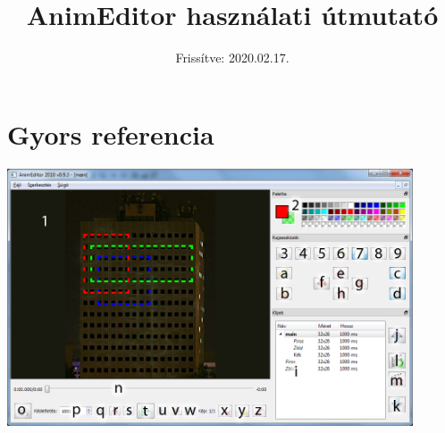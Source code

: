 \documentclass[a4paper,12pt,release]{article}
\title{AnimEditor használati útmutató}
\date{Frissítve: 2020.02.17.}
\begin{document}
\maketitle
\newpage
\tableofcontents
\clearpage
\section{Gyors referencia}
\includegraphics[width=0.9\textwidth]{pics/main.jpg}\\
\end{document}
